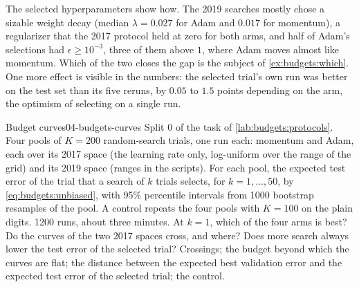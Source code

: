 \begin{refsection}
The selected hyperparameters show how. The 2019 searches mostly chose a sizable weight decay (median $\lambda=0.027$ for Adam and $0.017$ for momentum), a regularizer that the 2017 protocol held at zero for both arms, and half of Adam's selections had $\epsilon\ge10^{-3}$, three of them above $1$, where Adam moves almost like momentum. Which of the two closes the gap is the subject of \cref{ex:budgets:which}. One more effect is visible in the numbers: the selected trial's own run was better on the test set than its five reruns, by $0.05$ to $1.5$ points depending on the arm, the optimism of selecting on a single run.

\begin{lab}{Budget curves}{04-budgets-curves}\label{lab:budgets:curves}
 Split 0 of the task of \cref{lab:budgets:protocols}. Four pools of $K=200$ random-search trials, one run each: momentum and Adam, each over its 2017 space (the learning rate only, log-uniform over the range of the grid) and its 2019 space (ranges in the scripts). For each pool, the expected test error of the trial that a search of $k$ trials selects, for $k=1,\dots,50$, by \eqref{eq:budgets:unbiased}, with 95\% percentile intervals from 1000 bootstrap resamples of the pool. A control repeats the four pools with $K=100$ on the plain digits. 1200 runs, about three minutes.
 At $k=1$, which of the four arms is best? Do the curves of the two 2017 spaces cross, and where? Does more search always lower the test error of the selected trial?
 Crossings; the budget beyond which the curves are flat; the distance between the expected best validation error and the expected test error of the selected trial; the control.
\end{lab}


\end{refsection}
